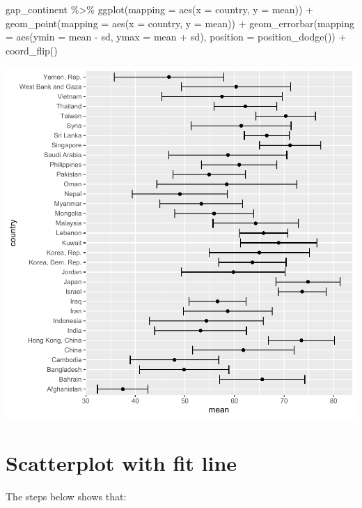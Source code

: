\documentclass[
]{book}
\makeatletter
\newenvironment{Shaded}{\begin{snugshade}}{\end{snugshade}}
\newcommand{\AttributeTok}[1]{\textcolor[rgb]{0.61,0.61,0.61}{#1}}
\newcommand{\FunctionTok}[1]{\textcolor[rgb]{0,0,0}{#1}}
\newcommand{\NormalTok}[1]{#1}
\newcommand{\SpecialCharTok}[1]{\textcolor[rgb]{0,0,0}{#1}}
\newenvironment{kframe}{%
\medskip{}
\setlength{\fboxsep}{.8em}
 \def\at@end@of@kframe{}%
 \ifinner\ifhmode%
  \def\at@end@of@kframe{\end{minipage}}%
  \begin{minipage}{\columnwidth}%
 \fi\fi%
 \def\FrameCommand##1{\hskip\@totalleftmargin \hskip-\fboxsep
 \colorbox{shadecolor}{##1}\hskip-\fboxsep
     \hskip-\linewidth \hskip-\@totalleftmargin \hskip\columnwidth}%
 \MakeFramed {\advance\hsize-\width
   \@totalleftmargin\z@ \linewidth\hsize
   \@setminipage}}%
 {\par\unskip\endMakeFramed%
 \at@end@of@kframe}
\renewenvironment{Shaded}{\begin{kframe}}{\end{kframe}}
\makeatother
\begin{document}
\begin{Shaded}
\begin{Highlighting}[]
\NormalTok{gap\_continent }\SpecialCharTok{\%\textgreater{}\%}   
  \FunctionTok{ggplot}\NormalTok{(}\AttributeTok{mapping =} \FunctionTok{aes}\NormalTok{(}\AttributeTok{x =}\NormalTok{ country, }\AttributeTok{y =}\NormalTok{ mean)) }\SpecialCharTok{+} 
  \FunctionTok{geom\_point}\NormalTok{(}\AttributeTok{mapping =} \FunctionTok{aes}\NormalTok{(}\AttributeTok{x =}\NormalTok{ country, }\AttributeTok{y =}\NormalTok{ mean)) }\SpecialCharTok{+}
  \FunctionTok{geom\_errorbar}\NormalTok{(}\AttributeTok{mapping =} \FunctionTok{aes}\NormalTok{(}\AttributeTok{ymin =}\NormalTok{ mean }\SpecialCharTok{{-}}\NormalTok{ sd, }\AttributeTok{ymax =}\NormalTok{ mean }\SpecialCharTok{+}\NormalTok{ sd),}
                \AttributeTok{position =} \FunctionTok{position\_dodge}\NormalTok{()) }\SpecialCharTok{+}
  \FunctionTok{coord\_flip}\NormalTok{()}
\end{Highlighting}
\end{Shaded}

\begin{center}\includegraphics[width=0.7\linewidth,keepaspectratio]{Multivariable_Data_Analysis_files/figure-latex/unnamed-chunk-94-1} \end{center}

\hypertarget{scatterplot-with-fit-line}{%
\section{Scatterplot with fit line}\label{scatterplot-with-fit-line}}

The steps below shows that:
\end{document}
